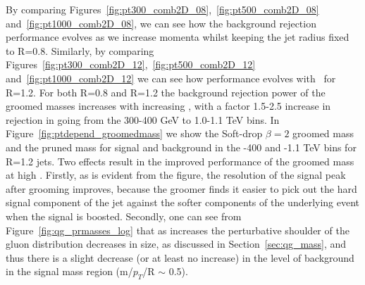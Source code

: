 By comparing
Figures~\ref{fig:pt300_comb2D_08},~\ref{fig:pt500_comb2D_08}
and~\ref{fig:pt1000_comb2D_08}, we can see how the background
rejection performance evolves as we increase momenta whilst keeping the jet
radius fixed to R=0.8. Similarly, by comparing Figures~\ref{fig:pt300_comb2D_12},~\ref{fig:pt500_comb2D_12}
and~\ref{fig:pt1000_comb2D_12} we can see how performance evolves with
\pt~for R=1.2. For both R=0.8 and R=1.2 the background rejection power of
the groomed masses increases with increasing \pt, with a factor 1.5-2.5 increase in rejection in going from the 300-400 GeV to
1.0-1.1 TeV bins. In Figure~\ref{fig:ptdepend_groomedmass} we show the
Soft-drop $\beta=2$ groomed mass and the pruned mass for signal and background in the -400 and -1.1 TeV bins for R=1.2 jets. Two effects result in the improved
performance of the groomed mass at high \pt. Firstly, as is evident
from the figure, the resolution of the signal peak after grooming
improves, because the groomer finds it easier to pick out the hard
signal component of the jet against the softer components of the
underlying event when the signal is boosted. Secondly, one can see
from Figure~\ref{fig:qg_prmasses_log} 
that as \pt increases the perturbative shoulder of the gluon
distribution decreases in size, as
discussed in Section~\ref{sec:qg_mass}, and
thus there is a slight decrease (or at least no increase) in the level of background in the
signal mass region (m/$p_{T}$/R $\sim$ 0.5). 


